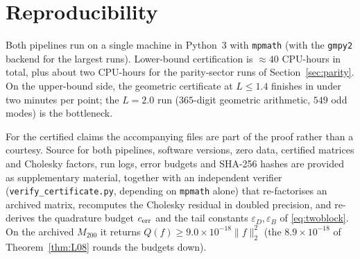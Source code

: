 ﻿\documentclass[11pt]{article}
\begin{document}
\section{Reproducibility}\label{sec:repro}

Both pipelines run on a single machine in Python~3 with
\texttt{mpmath} \cite{mpmath} (with the \texttt{gmpy2} backend for the
largest runs).  Lower-bound certification is $\approx40$ CPU-hours in
total, plus about two CPU-hours for the parity-sector runs of
Section~\ref{sec:parity}.  On the upper-bound side, the geometric
certificate at $L\le1.4$ finishes in under two minutes per point; the
$L=2.0$ run ($365$-digit geometric arithmetic, $549$ odd modes) is the
bottleneck.

For the certified claims the accompanying files are part of the proof
rather than a courtesy.  Source for both pipelines, software versions,
zero data, certified matrices and Cholesky factors, run logs, error
budgets and SHA-256 hashes are provided as supplementary material,
together with an independent verifier (\texttt{verify\_certificate.py},
depending on \texttt{mpmath} alone) that re-factorises an archived
matrix, recomputes the Cholesky residual in doubled precision, and
re-derives the quadrature budget $c_{\rm err}$ and the tail constants
$\varepsilon_D,\varepsilon_B$ of \eqref{eq:twoblock}.  On the archived
$M_{200}$ it returns $Q(f)\ge9.0\times10^{-18}\|f\|_2^2$
(the $8.9\times10^{-18}$ of Theorem~\ref{thm:L08} rounds the budgets
down).
\end{document}
